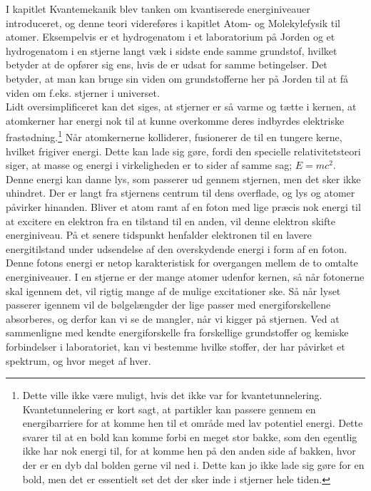 I kapitlet Kvantemekanik blev tanken om kvantiserede energiniveauer introduceret, og denne teori videreføres i kapitlet Atom- og Molekylefysik til atomer. Eksempelvis er et hydrogenatom i et laboratorium på Jorden og et hydrogenatom i en stjerne langt væk i sidste ende samme grundstof, hvilket betyder at de opfører sig ens, hvis de er udsat for samme betingelser. Det betyder, at man kan bruge sin viden om grundstofferne her på Jorden til at få viden om f.eks. stjerner i universet. \\
Lidt oversimplificeret kan det siges, at stjerner er så varme og tætte i kernen, at atomkerner har energi nok til at kunne overkomme deres indbyrdes elektriske frastødning.\footnote{Dette ville ikke være muligt, hvis det ikke var for kvantetunnelering. Kvantetunnelering er kort sagt, at partikler kan passere gennem en energibarriere for at komme hen til et område med lav potentiel energi. Dette svarer til at en bold kan komme forbi en meget stor bakke, som den egentlig ikke har nok energi til, for at komme hen på den anden side af bakken, hvor der er en dyb dal bolden gerne vil ned i. Dette kan jo ikke lade sig gøre for en bold, men det er essentielt set det der sker inde i stjerner hele tiden.} Når atomkernerne kolliderer, fusionerer de til en tungere kerne, hvilket frigiver energi. Dette kan lade sig gøre, fordi den specielle relativitetsteori siger, at masse og energi i virkeligheden er to sider af samme sag; $E=mc^2$. Denne energi kan danne lys, som passerer ud gennem stjernen, men det sker ikke uhindret. Der er langt fra stjernens centrum til dens overflade, og lys og atomer påvirker hinanden. Bliver et atom ramt af en foton med lige præcis nok energi til at excitere en elektron fra en tilstand til en anden, vil denne elektron skifte energiniveau. På et senere tidspunkt henfalder elektronen til en lavere energitilstand under udsendelse af den overskydende energi i form af en foton. Denne fotons energi er netop karakteristisk for overgangen mellem de to omtalte energiniveauer. I en stjerne er der mange atomer udenfor kernen, så når fotonerne skal igennem det, vil rigtig mange af de mulige excitationer ske. Så når lyset passerer igennem vil de bølgelængder der lige passer med energiforskellene absorberes, og derfor kan vi se de mangler, når vi kigger på stjernen. Ved at sammenligne med kendte energiforskelle fra forskellige grundstoffer og kemiske forbindelser i laboratoriet, kan vi bestemme hvilke stoffer, der har påvirket et spektrum, og hvor meget af hver.  \\

